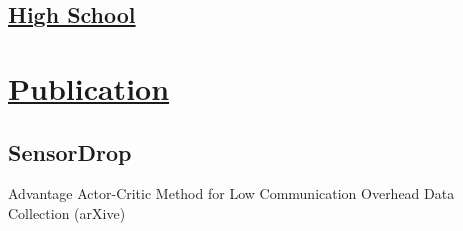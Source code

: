 \documentclass[]{plushcv}
\begin{document}
\begin{minipage}[t]{0.25\textwidth}
\sectionsep
\subsection{\href{https://en.wikipedia.org/wiki/National_Organization_for_Development_of_Exceptional_Talents}{High School}}
\sectionsep

\section{\href{https://scholar.google.com/citations?view_op=view_citation&hl=en&user=PEj2AqMAAAAJ&citation_for_view=PEj2AqMAAAAJ:aqlVkmm33-oC}{Publication}}
\subsection{SensorDrop}
 Advantage Actor-Critic Method for Low Communication Overhead Data Collection (arXive)


\end{minipage} 
\end{document}
